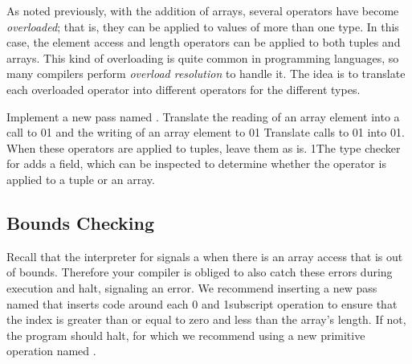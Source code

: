 \documentclass[7x10]{TimesAPriori_MIT}%
\def\racketEd{0}
\def\pythonEd{1}
\def\edition{1}
\newcommand{\racket}[1]{{\if\edition\racketEd{#1}\fi}}
\newcommand{\pythonColor}[0]{}
\newcommand{\python}[1]{{\if\edition\pythonEd\pythonColor #1\fi}}
\numberwithin{theorem}{chapter}
\numberwithin{definition}{chapter}
\numberwithin{equation}{chapter}
\begin{document}
As noted previously, with the addition of arrays, several operators
have become \emph{overloaded}; that is, they can be applied to values
of more than one type. In this case, the element access and length
operators can be applied to both tuples and arrays. This kind of
overloading is quite common in programming languages, so many
compilers perform \emph{overload resolution} to handle it. The idea is to translate each overloaded
operator into different operators for the different types.

Implement a new pass named . 
Translate the reading of an array element
into a call to
\racket{}\python{}
and the writing of an array element to
\racket{}\python{}
Translate calls to \racket{}\python{}
into \racket{}\python{}.
When these operators are applied to tuples, leave them as is.
%
\python{The type checker for \LangArray{} adds a \code{has\_type}
  field, which can be inspected to determine whether the operator
  is applied to a tuple or an array.}


\subsection{Bounds Checking}

Recall that the interpreter for \LangArray{} signals a
 when there is an array access that is out of
bounds. Therefore your compiler is obliged to also catch these errors
during execution and halt, signaling an error. We recommend inserting
a new pass named  that inserts code around each
\racket{ and }
\python{subscript} operation to ensure that the index is greater than
or equal to zero and less than the array's length. If not, the program
should halt, for which we recommend using a new primitive operation
named .


\end{document}
